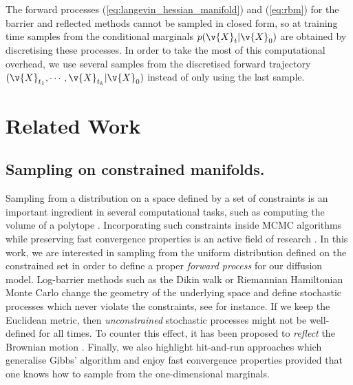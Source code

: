 The forward processes (\ref{eq:langevin_hessian_manifold}) and (\ref{eq:rbm}) for the barrier and reflected methods cannot be sampled in closed form, so at training time samples from the conditional marginals \(p(\v{X}_t|\v{X}_0)\) are obtained by discretising these processes.
In order to take the most of this computational overhead, we use several samples from the discretised forward trajectory \((\v{X}_{t_1}, \cdots, \v{X}_{t_k}|\v{X}_0)\) instead of only using the last sample.

\section{Related Work}

\subsection{Sampling on constrained manifolds.}
Sampling from a distribution on a space defined by a set of constraints is an important ingredient in several computational tasks, such as computing the volume of a polytope \parencite{lee2017Geodesic}.
Incorporating such constraints inside MCMC algorithms while preserving fast convergence properties is an active field of research \parencite{kook2022sampling,lee2017Geodesic,noble2022Barrier}.
In this work, we are interested in sampling from the uniform distribution defined on the constrained set in order to define a proper \emph{forward process} for our diffusion model.
Log-barrier methods such as the Dikin walk or Riemannian Hamiltonian Monte Carlo \cite{Kannan2009,lee2017Geodesic,noble2022Barrier} change the geometry of the underlying space and define stochastic processes which never violate the constraints, see \cite{Kannan2009,noble2022Barrier} for instance.
If we keep the Euclidean metric, then \emph{unconstrained} stochastic processes might not be well-defined for all times.
To counter this effect, it has been proposed to \emph{reflect} the Brownian motion \cite{williams1987Reflected,petit1997Time,shkolnikov2013Timereversal}.
Finally, we also highlight hit-and-run approaches \parencite{Smith1984,Lovasz2006} which generalise Gibbs' algorithm and enjoy fast convergence properties provided that one knows how to sample from the one-dimensional marginals.

